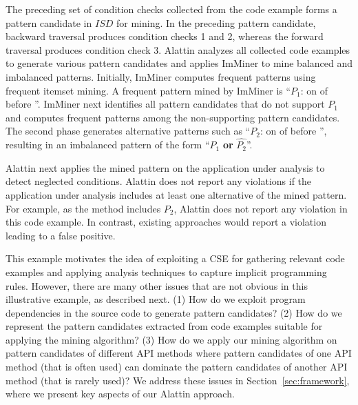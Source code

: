 The preceding set of condition checks collected from the code example forms a pattern candidate
in $ISD$ for mining. In the preceding pattern candidate, backward traversal
produces condition checks 1 and 2, whereas the forward traversal produces 
condition check 3. Alattin analyzes all collected
code examples to generate various pattern candidates and applies ImMiner
to mine balanced and imbalanced patterns. Initially, ImMiner
computes frequent patterns using frequent itemset mining.
A frequent pattern mined by ImMiner is ``$P_1$:  on 
of  before ''.
ImMiner next identifies all pattern candidates that do not support 
$P_1$ and computes frequent patterns among the non-supporting pattern candidates. 
The second phase generates alternative patterns such as
``$P_2$:  on 
of  before '',
resulting in an imbalanced pattern of the form ``$P_1$ \textbf{or} $\hat{P_2}$''.

Alattin next applies the mined pattern on the application under analysis 
to detect neglected conditions. Alattin does not report any 
violations if the application under analysis includes at least
one alternative of the mined pattern. For example, as the 
 method includes $P_2$, Alattin does not report
any violation in this code example. In contrast, existing 
approaches would report a violation leading to a false positive.

This example motivates the idea of 
exploiting a CSE for gathering relevant code examples
and applying analysis techniques to capture implicit programming rules. 
However, there are many other issues that are not obvious
in this illustrative example, as described next. 
(1) How do we exploit program dependencies in the source code to generate pattern candidates?
(2) How do we represent the pattern candidates extracted from code examples suitable for
applying the mining algorithm?
(3) How do we apply our mining algorithm on pattern candidates of different API
methods where pattern candidates of one API method (that is often used) can dominate the
pattern candidates of another API method (that is rarely used)? 
We address these issues in Section~\ref{sec:framework}, where we present key aspects
of our Alattin approach.
